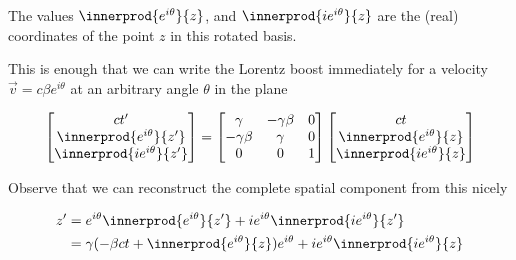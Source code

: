 The values $\innerprod{e^{i \theta}}{z}$, and $\innerprod{i e^{i\theta} }{z}$ are the (real) coordinates of the point $z$ in this rotated basis.

This is enough that we can write the Lorentz boost immediately for a velocity $\vec{v} = c \beta e^{i\theta}$ at an arbitrary angle $\theta$ in the plane

\begin{equation}\label{eqn:complexPlanarBoost:170}
\begin{bmatrix}
ct' \\
\innerprod{e^{i\theta}}{z'} \\
\innerprod{i e^{i\theta}}{z'} 
\end{bmatrix}
=
\begin{bmatrix}
\gamma & -\gamma \beta & 0 \\
-\gamma \beta & \gamma & 0 \\
0 & 0 & 1
\end{bmatrix}
\begin{bmatrix}
ct \\
\innerprod{e^{i\theta}}{z} \\
\innerprod{i e^{i\theta}}{z} 
\end{bmatrix}
\end{equation}

Observe that we can reconstruct the complete spatial component from this nicely

\begin{align*}
z' 
&= 
e^{i\theta} \innerprod{e^{i\theta}}{z'} 
+ i e^{i\theta} \innerprod{i e^{i\theta}}{z'}  \\
&=
\gamma( -\beta c t + \innerprod{e^{i\theta}}{z} ) e^{i\theta}
+ i e^{i\theta} \innerprod{i e^{i\theta}}{z}  \\
\end{align*}

\EndNoBibArticle
